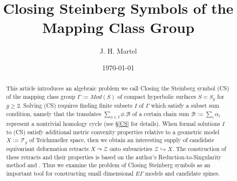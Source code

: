 \documentclass[12pt]{amsart}
\theoremstyle{definition}
\theoremstyle{remark}
\newcommand{\sB}{\mathscr{B}}
\newcommand{\sT}{\mathscr{T}}
\newcommand{\sZ}{\mathscr{Z}}
\begin{document}
\title{Closing Steinberg Symbols of the Mapping Class Group}
\author{J. H. Martel}
\date{\today}
\maketitle

\begin{abstract}
This article introduces an algebraic problem we call Closing the Steinberg symbol (CS) of the mapping class group $\Gamma:=Mod(S)$ of compact hyperbolic surfaces $S=S_g$ for $g\geq 2$. Solving (CS) requires finding finite subsets $I$ of $\Gamma$ which satisfy a subset sum condition, namely that the translates $\sum_{\phi \in I}\phi.\sB$ of a certain chain sum $\sB:=\sum_i \alpha_i$ represent a nontrivial homology cycle (see \S\ref{CS} for details). When formal solutions $I$ to (CS) satisfy additional metric convexity properties relative to a geometric model $X:=\sT_g$ of Teichmueller space, then we obtain an interesting supply of candidate equivariant deformation retracts $X \leadsto \sZ$ onto subvarieties $\sZ \hookrightarrow X$. The construction of these retracts and their properties is based on the author's Reduction-to-Singularity method \cite{martel} and \cite{martel2022}. Thus we examine the problem of Closing Steinberg symbols as an important tool for constructing small dimensional $E\Gamma$ models and candidate spines. 
\end{abstract}


\tableofcontents





\end{document}
